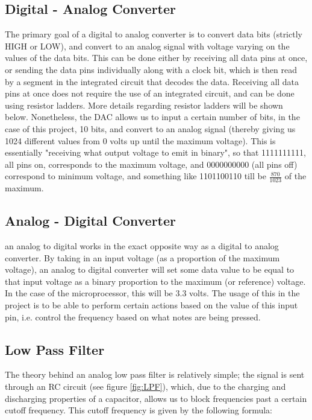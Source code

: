 \documentclass[10pt]{article}
\begin{document}
\subsection{Digital - Analog Converter}\label{Digital - Analog Converter}

The primary goal of a digital to analog converter is to convert data bits (strictly HIGH or LOW), and convert to an analog signal with voltage varying on the values of the data bits. This can be done either by receiving all data pins at once, or sending the data pins individually along with a clock bit, which is then read by a segment in the integrated circuit that decodes the data. Receiving all data pins at once does not require the use of an integrated circuit, and can be done using resistor ladders. More details regarding resistor ladders will be shown below. Nonetheless, the DAC allows us to input a certain number of bits, in the case of this project, 10 bits, and convert to an analog signal (thereby giving us 1024 different values from 0 volts up until the maximum voltage). This is essentially "receiving what output voltage to emit in binary", so that 1111111111, all pins on, corresponds to the maximum voltage, and 0000000000 (all pins off) correspond to minimum voltage, and something like 1101100110 till be $\frac{870}{1023}$ of the maximum. 

\subsection{Analog - Digital Converter}\label{Analog - Digital Converter}

an analog to digital works in the exact opposite way as a digital to analog converter. By taking in an input voltage (as a proportion of the maximum voltage), an analog to digital converter will set some data value to be equal to that input voltage as a binary proportion to the maximum (or reference) voltage. In the case of the microprocessor, this will be 3.3 volts. The usage of this in the project is to be able to perform certain actions based on the value of this input pin, i.e. control the frequency based on what notes are being pressed. 

\subsection{Low Pass Filter}\label{Low Pass Filter}

The theory behind an analog low pass filter is relatively simple; the signal is sent through an RC circuit (see figure \ref{fig:LPF}), which, due to the charging and discharging properties of a capacitor, allows us to block frequencies past a certain cutoff frequency. This cutoff frequency is given by the following formula:
\end{document}
